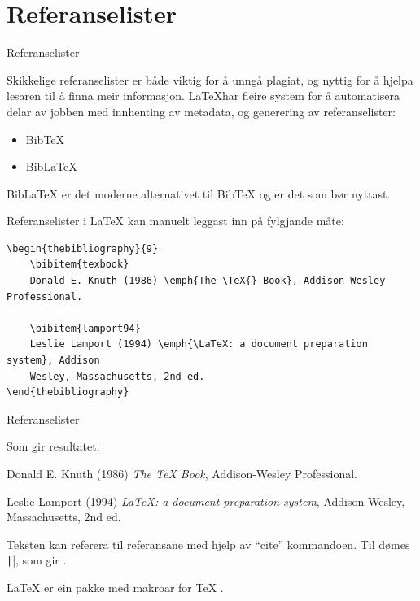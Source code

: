 
\section{Referanselister}

	\begin{frame}{Referanselister}
	
	Skikkelige referanselister er både viktig for å unngå plagiat, og nyttig for å hjelpa lesaren til å finna meir informasjon. \LaTeX har fleire system for å automatisera delar av jobben med innhenting av metadata, og generering av referanselister:
	
	\begin{itemize}
		\item BibTeX
		\item BibLaTeX
	\end{itemize}
	
	BibLaTeX er det moderne alternativet til BibTeX og er det som bør nyttast.
	
\end{frame}





\begin{frame}[containsverbatim]
	
	Referanselister i \LaTeX{} kan manuelt leggast inn på fylgjande måte:
	
	\begin{verbatim}
\begin{thebibliography}{9}
	\bibitem{texbook}
	Donald E. Knuth (1986) \emph{The \TeX{} Book}, Addison-Wesley Professional.
	
	\bibitem{lamport94}
	Leslie Lamport (1994) \emph{\LaTeX: a document preparation system}, Addison
	Wesley, Massachusetts, 2nd ed.
\end{thebibliography}
	\end{verbatim}
	
\end{frame}


\begin{frame}[containsverbatim]{Referanselister}
	
	Som gir resultatet:
	
	\begin{thebibliography}{9}
		Donald E. Knuth (1986) \emph{The \TeX{} Book}, Addison-Wesley Professional.
		
		Leslie Lamport (1994) \emph{\LaTeX: a document preparation system}, Addison
		Wesley, Massachusetts, 2nd ed.
	\end{thebibliography}
	
	Teksten kan referera til referansane med hjelp av ``cite'' kommandoen. Til dømes \texttt|\cite{lamport94}|, som gir \cite{lamport94}.
	
	\LaTeX{} \cite{lamport94} er ein pakke med makroar for \TeX{} \cite{texbook}.
	
\end{frame}



